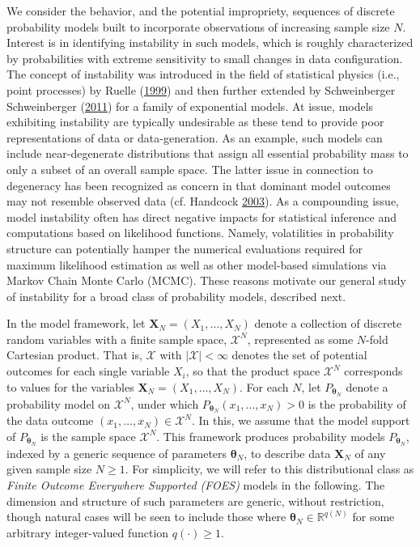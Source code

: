 \documentclass[12pt]{article}
\theoremstyle{definition}
\begin{document}
We consider the behavior, and the potential impropriety, sequences of
discrete probability models built to incorporate observations of
increasing sample size \(N\). Interest is in identifying instability in
such models, which is roughly characterized by probabilities with
extreme sensitivity to small changes in data configuration. The concept
of instability was introduced in the field of statistical physics (i.e.,
point processes) by Ruelle
(\protect\hyperlink{ref-ruelle1999statistical}{1999}) and then further
extended by Schweinberger Schweinberger
(\protect\hyperlink{ref-schweinberger2011instability}{2011}) for a
family of exponential models. At issue, models exhibiting instability
are typically undesirable as these tend to provide poor representations
of data or data-generation. As an example, such models can include
near-degenerate distributions that assign all essential probability mass
to only a subset of an overall sample space. The latter issue in
connection to degeneracy has been recognized as concern in that dominant
model outcomes may not resemble observed data (cf. Handcock
\protect\hyperlink{ref-handcock2003assessing}{2003}). As a compounding
issue, model instability often has direct negative impacts for
statistical inference and computations based on likelihood functions.
Namely, volatilities in probability structure can potentially hamper the
numerical evaluations required for maximum likelihood estimation as well
as other model-based simulations via Markov Chain Monte Carlo (MCMC).
These reasons motivate our general study of instability for a broad
class of probability models, described next.

In the model framework, let \(\boldsymbol X_N = (X_1, \dots, X_N)\)
denote a collection of discrete random variables with a finite sample
space, \(\mathcal{X}^N\), represented as some \(N\)-fold Cartesian
product. That is, \(\mathcal{X}\) with \(|\mathcal{X}| < \infty\)
denotes the set of potential outcomes for each single variable \(X_i\),
so that the product space \(\mathcal{X}^N\) corresponds to values for
the variables \(\boldsymbol X_N=(X_1,\ldots,X_N)\). For each \(N\), let
\(P_{\boldsymbol \theta_N}\) denote a probability model on
\(\mathcal{X}^N\), under which
\(P_{\boldsymbol \theta_N}(x_1, \dots, x_N) > 0\) is the probability of
the data outcome \((x_1, \dots, x_N) \in \mathcal{X}^N\). In this, we
assume that the model support of \(P_{\boldsymbol \theta_N}\) is the
sample space \(\mathcal{X}^N\). This framework produces probability
models \(P_{\boldsymbol \theta_N}\), indexed by a generic sequence of
parameters \(\boldsymbol \theta_N\), to describe data
\(\boldsymbol X_N\) of any given sample size \(N \geq 1\). For
simplicity, we will refer to this distributional class as \emph{Finite
Outcome Everywhere Supported (FOES)} models in the following. The
dimension and structure of such parameters are generic, without
restriction, though natural cases will be seen to include those where
\(\boldsymbol \theta_N \in \mathbb{R}^{q(N)}\) for some arbitrary
integer-valued function \(q(\cdot) \geq 1\).
\end{document}
